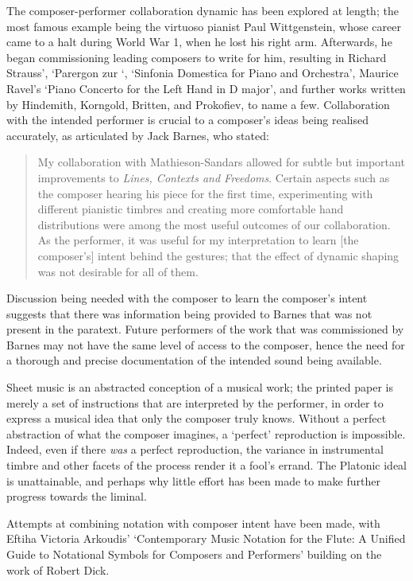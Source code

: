 The composer-performer collaboration dynamic has been explored at length; the most famous example being the virtuoso pianist Paul Wittgenstein, whose career came to a halt during World War 1, when he lost his right arm.
Afterwards, he began commissioning leading composers to write for him, resulting in Richard Strauss', `Parergon zur `, `Sinfonia Domestica for Piano and Orchestra', Maurice Ravel's `Piano Concerto for the Left Hand in D major', and further works written by Hindemith, Korngold, Britten, and Prokofiev, to name a few.\autocite[107]{predotaPaulWittgensteinVoice2014}
Collaboration with the intended performer is crucial to a composer's ideas being realised accurately, as articulated by Jack Barnes, who stated:
\begin{quotation}
    My collaboration with Mathieson-Sandars allowed for subtle but important improvements to \emph{Lines, Contexts and Freedoms}. 
    Certain aspects such as the composer hearing his piece for the first time, experimenting with different pianistic timbres and creating more comfortable hand distributions were among the most useful outcomes of our collaboration. 
    As the performer, it was useful for my interpretation to learn [the composer's] intent behind the gestures; that the effect of dynamic shaping was not desirable for all of them.\autocite[20]{jackbarnesExaminationComposerPerformerCollaborations2017}
\end{quotation}
Discussion being needed with the composer to learn the composer's intent suggests that there was information being provided to Barnes that was not present in the paratext.
Future performers of the work that was commissioned by Barnes may not have the same level of access to the composer, hence the need for a thorough and precise documentation of the intended sound being available.

Sheet music is an abstracted conception of a musical work; the printed paper is merely a set of instructions that are interpreted by the performer, in order to express a musical idea that only the composer truly knows.
Without a perfect abstraction of what the composer imagines, a `perfect' reproduction is impossible.
Indeed, even if there \emph{was} a perfect reproduction, the variance in instrumental timbre and other facets of the process render it a fool's errand.
The Platonic ideal is unattainable, and perhaps why little effort has been made to make further progress towards the liminal.

Attempts at combining notation with composer intent have been made, with Eftiha Victoria Arkoudis' `Contemporary Music Notation for the Flute: A Unified Guide to Notational Symbols for Composers and Performers' building on the work of Robert Dick.\autocite{arkoudisContemporaryMusicNotation2019}

